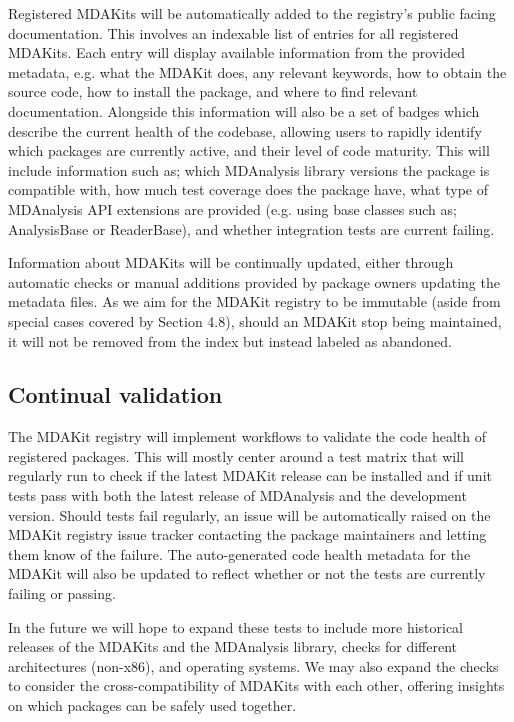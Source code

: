 \documentclass{article}
\begin{document}
Registered MDAKits will be automatically added to the registry’s public facing documentation. This involves an indexable list of entries for all registered MDAKits. Each entry will display available information from the provided metadata, e.g. what the MDAKit does, any relevant keywords, how to obtain the source code, how to install the package, and where to find relevant documentation. Alongside this information will also be a set of badges which describe the current health of the codebase, allowing users to rapidly identify which packages are currently active, and their level of code maturity. This will include information such as; which MDAnalysis library versions the package is compatible with, how much test coverage does the package have, what type of MDAnalysis API extensions are provided (e.g. using base classes such as; AnalysisBase or ReaderBase), and whether integration tests are current failing.

Information about MDAKits will be continually updated, either through automatic checks or manual additions provided by package owners updating the metadata files. As we aim for the MDAKit registry to be immutable (aside from special cases covered by Section 4.8), should an MDAKit stop being maintained, it will not be removed from the index but instead labeled as abandoned.

\subsection{Continual validation}

The MDAKit registry will implement workflows to validate the code health of registered packages. This will mostly center around a test matrix that will regularly run to check if the latest MDAKit release can be installed and if unit tests pass with both the latest release of MDAnalysis and the development version. Should tests fail regularly, an issue will be automatically raised on the MDAKit registry issue tracker contacting the package maintainers and letting them know of the failure. The auto-generated code health metadata for the MDAKit will also be updated to reflect whether or not the tests are currently failing or passing.

In the future we will hope to expand these tests to include more historical releases of the MDAKits and the MDAnalysis library, checks for different architectures (non-x86), and operating systems. We may also expand the checks to consider the cross-compatibility of MDAKits with each other, offering insights on which packages can be safely used together.
\end{document}
